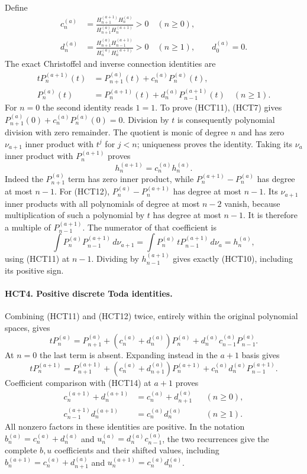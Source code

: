 Define
\begin{align}
 c_n^{(a)}&=\frac{H_{n+1}^{(a+1)}H_n^{(a)}}
 {H_{n+1}^{(a)}H_n^{(a+1)}}>0 \quad(n\geq0),\tag{HCT9}\\
 d_n^{(a)}&=\frac{H_{n+1}^{(a)}H_{n-1}^{(a+1)}}
 {H_n^{(a)}H_n^{(a+1)}}>0 \quad(n\geq1),\qquad d_0^{(a)}=0.\tag{HCT10}
\end{align}
The exact Christoffel and inverse connection identities are
\begin{align}
 tP_n^{(a+1)}(t)&=P_{n+1}^{(a)}(t)+c_n^{(a)}P_n^{(a)}(t),\tag{HCT11}\\
 P_n^{(a)}(t)&=P_n^{(a+1)}(t)+d_n^{(a)}P_{n-1}^{(a+1)}(t)
 \quad(n\geq1).\tag{HCT12}
\end{align}
For $n=0$ the second identity reads $1=1$.
To prove (HCT11), (HCT7) gives
$P_{n+1}^{(a)}(0)+c_n^{(a)}P_n^{(a)}(0)=0$.
Division by $t$ is consequently polynomial division with zero
remainder. The quotient is monic of degree $n$ and has zero
$\nu_{a+1}$ inner product with $t^j$ for $j<n$; uniqueness proves
the identity. Taking its $\nu_a$ inner product with
$P_n^{(a+1)}$ proves
\begin{equation}\tag{HCT13}
 h_n^{(a+1)}=c_n^{(a)}h_n^{(a)}.
\end{equation}
Indeed the $P_{n+1}^{(a)}$ term has zero inner product, while
$P_n^{(a+1)}-P_n^{(a)}$ has degree at most $n-1$.
For (HCT12), $P_n^{(a)}-P_n^{(a+1)}$ has degree at most $n-1$.
Its $\nu_{a+1}$ inner products with all polynomials of degree at
most $n-2$ vanish, because multiplication of such a polynomial by
$t$ has degree at most $n-1$. It is therefore a multiple of
$P_{n-1}^{(a+1)}$. The numerator of that coefficient is
\[
 \int P_n^{(a)}P_{n-1}^{(a+1)}\,d\nu_{a+1}
 =\int P_n^{(a)}\,tP_{n-1}^{(a+1)}\,d\nu_a=h_n^{(a)},
\]
using (HCT11) at $n-1$. Dividing by $h_{n-1}^{(a+1)}$ gives
exactly (HCT10), including its positive sign.

\paragraph{HCT4. Positive discrete Toda identities.}
Combining (HCT11) and (HCT12) twice, entirely within the original
polynomial spaces, gives
\begin{equation}\tag{HCT14}
 tP_n^{(a)}=P_{n+1}^{(a)}+
 (c_n^{(a)}+d_n^{(a)})P_n^{(a)}
 +d_n^{(a)}c_{n-1}^{(a)}P_{n-1}^{(a)}.
\end{equation}
At $n=0$ the last term is absent. Expanding instead in the
$a+1$ basis gives
\[
 tP_n^{(a+1)}=P_{n+1}^{(a+1)}+
 (c_n^{(a)}+d_{n+1}^{(a)})P_n^{(a+1)}
 +c_n^{(a)}d_n^{(a)}P_{n-1}^{(a+1)}.
\]
Coefficient comparison with (HCT14) at $a+1$ proves
\begin{align}
 c_n^{(a+1)}+d_n^{(a+1)}
 &=c_n^{(a)}+d_{n+1}^{(a)} &&(n\geq0),\tag{HCT15}\\
 c_{n-1}^{(a+1)}d_n^{(a+1)}
 &=c_n^{(a)}d_n^{(a)} &&(n\geq1).\tag{HCT16}
\end{align}
All nonzero factors in these identities are positive. In the
notation $b_n^{(a)}=c_n^{(a)}+d_n^{(a)}$ and
$u_n^{(a)}=d_n^{(a)}c_{n-1}^{(a)}$, the two recurrences give the
complete $b,u$ coefficients and their shifted values, including
$b_n^{(a+1)}=c_n^{(a)}+d_{n+1}^{(a)}$ and
$u_n^{(a+1)}=c_n^{(a)}d_n^{(a)}$.

